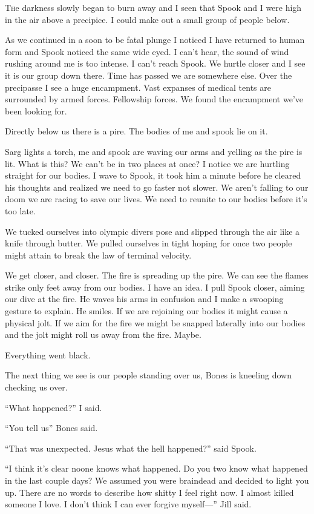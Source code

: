 \lettrine[lines=2,lraise=0]{T}he darkness slowly began to burn away and I seen that Spook and I were high in the air above a precipice. I could make out a small group of people below.

As we continued in a soon to be fatal plunge I noticed I have returned to human form and Spook noticed the same wide eyed. I can't hear, the sound of wind rushing around me is too intense. I can't reach Spook. We hurtle closer and I see it is our group down there. Time has passed we are somewhere else. Over the precipasse I see a huge encampment. Vast expanses of medical tents are surrounded by armed forces. Fellowship forces. We found the encampment we've been looking for.

Directly below us there is a pire. The bodies of me and spook lie on it.

Sarg lights a torch, me and spook are waving our arms and yelling as the pire is lit. What is this? We can't be in two places at once? I notice we are hurtling straight for our bodies. I wave to Spook, it took him a minute before he cleared his thoughts and realized we need to go faster not slower. We aren't falling to our doom we are racing to save our lives. We need to reunite to our bodies before it's too late.

We tucked ourselves into olympic divers pose and slipped through the air like a knife through butter. We pulled ourselves in tight hoping for once two people might attain to break the law of terminal velocity.

We get closer, and closer. The fire is spreading up the pire. We can see the flames strike only feet away from our bodies. I have an idea. I pull Spook closer, aiming our dive at the fire. He waves his arms in confusion and I make a swooping gesture to explain. He smiles. If we are rejoining our bodies it might cause a physical jolt. If we aim for the fire we might be snapped laterally into our bodies and the jolt might roll us away from the fire. Maybe.

Everything went black.

The next thing we see is our people standing over us, Bones is kneeling down checking us over.

``What happened?'' I said.

``You tell us'' Bones said.

``That was unexpected. Jesus what the hell happened?'' said Spook.

``I think it's clear noone knows what happened. Do you two know what happened in the last couple days? We assumed you were braindead and decided to light you up. There are no words to describe how shitty I feel right now. I almost killed someone I love. I don't think I can ever forgive myself---'' Jill said.


